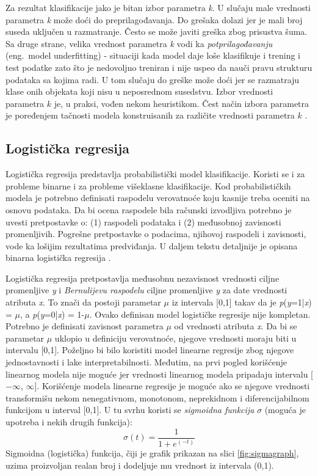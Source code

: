 \documentclass[12pt,oneside]{memoir}
\begin{document}
Za rezultat klasifikacije jako je bitan izbor parametra \textit{k}. U slučaju male vrednosti parametra \textit{k} može doći do preprilagođavanja. Do grešaka dolazi jer je mali broj suseda uključen u razmatranje. Često se može javiti greška zbog prisustva šuma. Sa druge strane, velika vrednost parametra \textit{k} vodi ka \textit{potprilagođavanju} (eng.~model underfitting) - situaciji kada model daje loše klasifikuje i trening i test podatke zato što je nedovoljno treniran i nije uspeo da nauči pravu strukturu podataka sa kojima radi. U tom slučaju do greške može doći jer se razmatraju klase onih objekata koji nisu u neposrednom susedstvu. Izbor vrednosti parametra $k$ je, u praksi, vođen nekom heuristikom. Čest način izbora parametra je poređenjem tačnosti modela konstruisanih za različite vrednosti parametra $k$ \cite{mladen, mitic, aggarwal}.

\subsection{Logistička regresija}

Logistička regresija predstavlja probabilistički model klasifikacije. Koristi se i za probleme binarne i za probleme višeklasne klasifikacije. Kod probabilističkih modela je potrebno definisati raspodelu verovatnoće koju kasnije treba oceniti na osnovu podataka. Da bi ocena raspodele bila računski izvodljiva potrebno je uvesti pretpostavke o: (1) raspodeli podataka i (2) međusobnoj zavisnosti promenljivih. Pogrešne pretpostavke o podacima, njihovoj raspodeli i zavisnosti, vode ka lošijim rezultatima predviđanja. U daljem tekstu detaljnije je opisana binarna logistička regresija \cite{mladen}.

Logistička regresija pretpostavlja međusobnu nezavisnost vrednosti ciljne promenljive \textit{y} i \textit{Bernulijevu raspodelu} ciljne promenljive \textit{y} za date vrednosti atributa \textit{x}. To znači da postoji parametar  $\mu$ iz intervala [0,1] takav da je  \textit{p}(\textit{y}=1|\textit{x}) = $\mu$, a  \textit{p}(\textit{y}=0|\textit{x}) = 1-$\mu$. Ovako definisan model logističke regresije nije kompletan. Potrebno je definisati zavisnost parametra $\mu$ od vrednosti atributa \textit{x}. Da bi se parametar $\mu$ uklopio u definiciju verovatnoće, njegove vrednosti moraju biti u intervalu [0,1]. Poželjno bi bilo koristiti model linearne regresije zbog njegove jednostavnosti i lake interpretabilnosti. Međutim, na prvi pogled korišćenje linearnog modela nije moguće jer vrednosti linearnog modela pripadaju intervalu [$-\infty$, $\infty$]. Korišćenje modela linearne regresije je moguće ako se njegove vrednosti transformišu nekom nenegativnom, monotonom, neprekidnom i diferencijabilnom funkcijom u interval [0,1]. U tu svrhu koristi se \textit{sigmoidna funkcija} $\sigma$ (moguća je upotreba i nekih drugih funkcija):
$$ \sigma(t) = \frac{\mathrm{1}}{\mathrm{1} + e^{(- t)}} $$
Sigmoidna (logistička) funkcija, čiji je grafik prikazan na slici \ref{fig:sigmagraph}, uzima proizvoljan realan broj i dodeljuje mu vrednost iz intervala (0,1). 
\end{document}
